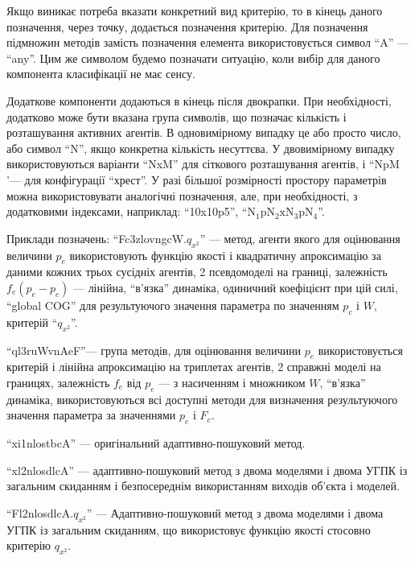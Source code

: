 Якщо виникає потреба вказати конкретний вид критерію, то в кінець даного
позначення, через точку, додається позначення критерію.
Для позначення підмножин методів замість позначення елемента використовується символ ``A'' --- ``any''.
Цим же символом будемо позначати ситуацію, коли вибір для даного
компонента класифікації не має сенсу.

Додаткове компоненти додаються в кінець після двокрапки. При
необхідності, додатково може бути вказана група символів, що
позначає кількість і розташування активних агентів.
В одновимірному випадку це або просто число, або символ ``N'',
якщо конкретна кількість несуттєва. У двовимірному випадку
використовуються варіанти ``NxM'' для сіткового розташування
агентів, і ``NpM '--- для конфігурації ``хрест''. У разі більшої
розмірності простору параметрів можна використовувати
аналогічні позначення, але, при необхідності, з додатковими
індексами, наприклад:
``10x10p5'', ``$\mathrm{N_1 p N_2 x N_3 p N_4}$''.

Приклади позначень:
``Fc3zlovngcW.$q_{x^2}$''
--- метод, агенти якого для оцінювання величини $p_e$ використовують функцію
якості і квадратичну апроксимацію за даними кожних трьох сусідніх агентів, 2
псевдомоделі на границі, залежність $f_e (p_e-p_c)$ --- лінійна, ``в'язка''
динаміка, одиничний коефіцієнт при цій силі, ``global COG'' для результуючого
значення параметра по значенням $p_c$ і $W$, критерій
``$q_{x^2}$''.



``ql3ruWvnAeF''---
група методів, для оцінювання величини
$ p_e $ використовується критерій і лінійна апроксимацію на
триплетах агентів, 2 справжні моделі на границях, залежність
$ f_e $ від $ p_e $ --- з насиченням і множником
$ W $, ``в'язка'' динаміка, використовуються всі доступні методи
для визначення результуючого значення параметра за значеннями  $ p_e $ і $ F_c $.

``xi1nlostbcA'' ---
оригінальний адаптивно-пошуковий метод.

``xl2nlosdlcA'' ---
адаптивно-пошуковий метод з двома моделями і двома УГПК із
загальним скиданням і безпосереднім використанням виходів
об'єкта і моделей.

``Fl2nlosdlcA.$q_{x^2}$'' ---
Адаптивно-пошуковий метод з двома моделями і двома УГПК із
загальним скиданням, що використовує функцію якості стосовно
критерію $q_{x^2}$.




